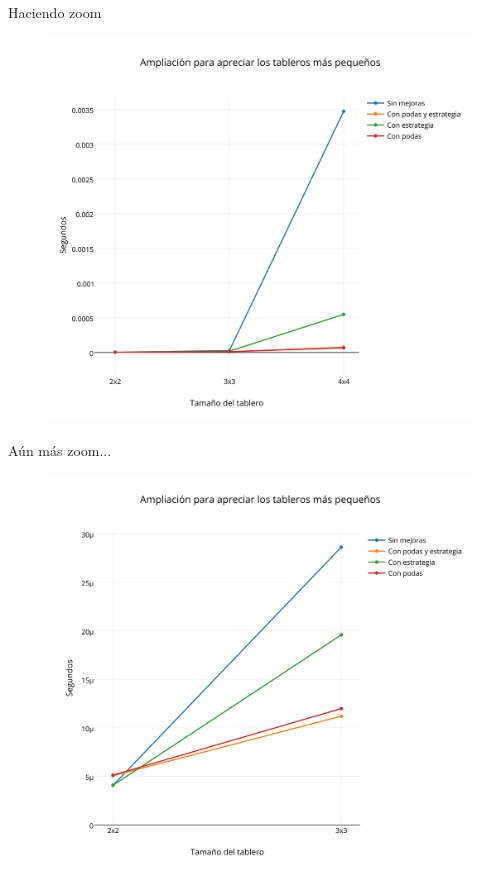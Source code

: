  Haciendo zoom

 \begin{figure}[h!]
   \begin{center}
   \includegraphics[scale=0.18]{../src/ej3/Mediciones/2caballos/promedios2.png} 
   \end{center}
 \end{figure}
 
A\'un m\'as zoom...

 \begin{figure}[h!]
   \begin{center}
   \includegraphics[scale=0.18]{../src/ej3/Mediciones/2caballos/promedios3.png} 
   \end{center}
 \end{figure}
 
